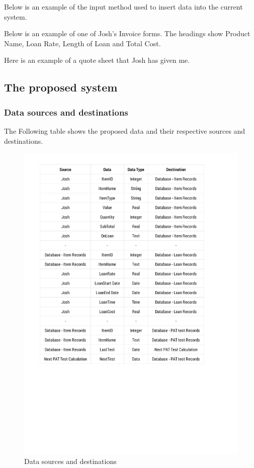 \documentclass[a4paper,12pt]{report}
\begin{document}
Below is an example of the input method used to insert data into the current system.




Below is an example of one of Josh's Invoice forms. The headings show Product Name, Loan Rate, Length of Loan and Total Cost.

Here is an example of a quote sheet that Josh has given me.

\newpage

\subsection{The proposed system}

\subsubsection{Data sources and destinations}

The Following table shows the proposed data and their respective sources and destinations.

\begin{figure}[H]
    \caption{Data sources and destinations} \label{fig: Data sources and destinations}
    \includegraphics[page=1,width=\textwidth]{./DataS&D/data_sources_&_destinations.pdf}
\end{figure}
\end{document}
